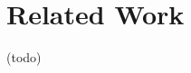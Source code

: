 \documentclass[10pt,a4paper]{article}
\begin{document}
\pagestyle{empty}

\pagebreak

\pagebreak
\setcounter{page}{1}
\pagestyle{plain}

\pagebreak

\pagebreak

\pagebreak

\pagebreak

\pagebreak
\section{Related Work}
(todo)
\printbibliography
\end{document}
